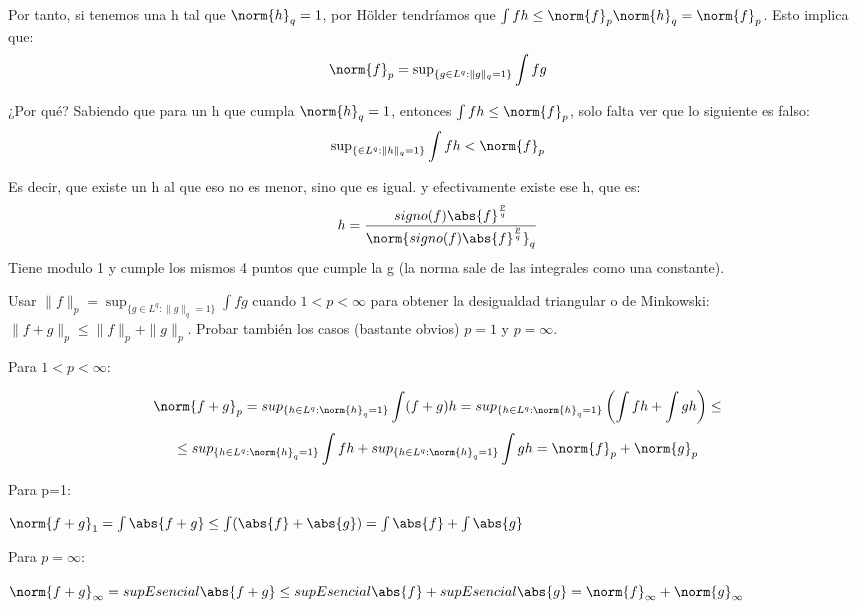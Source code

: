 \begin{problem}[4]
Por tanto, si tenemos una h tal que $\norm{h}_q = 1$, por Hölder tendríamos que $\int fh \leq \norm{f}_p \norm{h}_q = \norm{f}_p$. Esto implica que:
\[
\norm{f}_p =  \operatorname{sup}_{\{g\in L^q: \|g\|_q=1\}} \int fg
\]

¿Por qué? Sabiendo que para un h que cumpla $\norm{h}_q = 1$, entonces $\int fh \leq \norm{f}_p$, solo falta ver que lo siguiente es falso:
\[
 \operatorname{sup}_{\{\in L^q: \|h\|_q=1\}} \int fh < \norm{f}_p
\]

Es decir, que existe un h al que eso no es menor, sino que es igual. y efectivamente existe ese h, que es:
\[
h = \frac{signo(f)\abs{f}^\frac{p}{q}}{\norm{signo(f)\abs{f}^\frac{p}{q}}_q}
\]
Tiene modulo 1 y cumple los mismos 4 puntos que cumple la g (la norma sale  de las integrales como una constante).

\end{problem}


\begin{problem}[5] Usar $\|f\|_p= \operatorname{sup}_{\{g\in L^q: \|g\|_q=1\}} \int fg $ cuando $1 < p <  \infty$
para obtener la desigualdad triangular o de Minkowski: $\|f + g\|_p \le \|f\|_p + \|g\|_p$.
Probar tambi\'en los casos (bastante obvios) $p=1$  y  $p = \infty$.
\solution

\begin{expla}

\end{expla}
Para $1<p<\infty$:

\[
\norm{f+g}_p = sup_{\{h\in L^q: \norm{h}_q=1\}}\int (f+g)h =  sup_{\{h\in L^q: \norm{h}_q=1\}}\left(\int fh + \int gh\right) \leq 
\]
\[
\leq sup_{\{h\in L^q: \norm{h}_q=1\}}\int fh +  sup_{\{h\in L^q: \norm{h}_q=1\}} \int gh = \norm{f}_p + \norm{g}_p   
\]

Para p=1:

$\norm{f+g}_1 = \int \abs{f+g} \leq \int (\abs{f} + \abs{g})=  \int \abs{f} + \int \abs{g}$

Para $p=\infty$:

$\norm{f+g}_{\infty} = supEsencial\abs{f+g} \leq supEsencial\abs{f} + supEsencial\abs{g} = \norm{f}_{\infty} + \norm{g}_{\infty}$
\end{problem}


